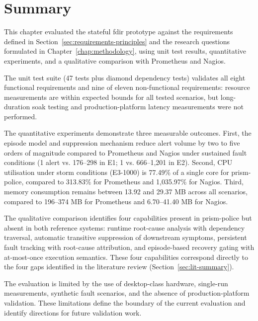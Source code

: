 \section{Summary}\label{sec:eval-summary}

This chapter evaluated the stateful \gls{fdir} prototype against the requirements defined in Section~\ref{sec:requirements-principles} and the research questions formulated in Chapter~\ref{chap:methodology}, using unit test results, quantitative experiments, and a qualitative comparison with Prometheus and Nagios.

The unit test suite (47 tests plus diamond dependency tests) validates all eight functional requirements and nine of eleven non-functional requirements: resource measurements are within expected bounds for all tested scenarios, but long-duration soak testing and production-platform latency measurements were not performed.

The quantitative experiments demonstrate three measurable outcomes. First, the episode model and suppression mechanism reduce alert volume by two to five orders of magnitude compared to Prometheus and Nagios under sustained fault conditions (1 alert vs. 176--298 in E1; 1 vs. 666--1,201 in E2). Second, CPU utilisation under storm conditions (E3-1000) is 77.49\% of a single core for prism-police, compared to 313.83\% for Prometheus and 1,035.97\% for Nagios. Third, memory consumption remains between 13.92 and 29.37 MB across all scenarios, compared to 196--374 MB for Prometheus and 6.70--41.40 MB for Nagios.

The qualitative comparison identifies four capabilities present in prism-police but absent in both reference systems: runtime root-cause analysis with dependency traversal, automatic transitive suppression of downstream symptoms, persistent fault tracking with root-cause attribution, and episode-based recovery gating with at-most-once execution semantics. These four capabilities correspond directly to the four gaps identified in the literature review (Section~\ref{sec:lit-summary}).

The evaluation is limited by the use of desktop-class hardware, single-run measurements, synthetic fault scenarios, and the absence of production-platform validation. These limitations define the boundary of the current evaluation and identify directions for future validation work.
